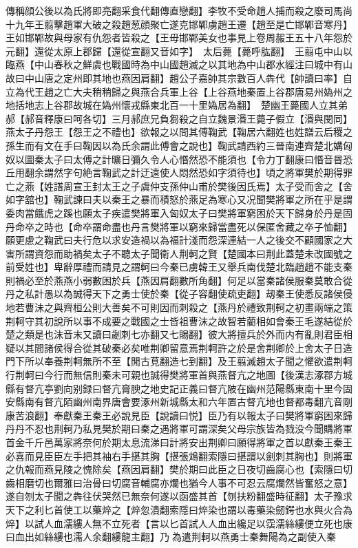 傳稱顔公後以為氏將即亮翻采食代翻傳直戀翻】李牧不受命趙人捕而殺之廢司馬尚十九年王翦擊趙軍大破之殺趙葱顔聚亡遂克邯鄲虜趙王遷【趙至是亡邯鄲音寒丹】王如邯鄲故與母家有仇怨者皆殺之【王毋邯鄲美女也事見上卷周赧王五十八年怨於元翻】還從太原上郡歸【還從宣翻又音如字】　太后薨【薨呼肱翻】　王翦屯中山以臨燕【中山春秋之鮮虞也戰國時為中山國趙滅之以其地為中山郡水經注曰城中有山故曰中山唐之定州即其地也燕因肩翻】趙公子嘉帥其宗數百人犇代【帥讀曰率】自立為代王趙之亡大夫稍稍歸之與燕合兵軍上谷【上谷燕地秦置上谷郡唐易州媯州之地括地志上谷郡故城在媯州懷戎縣東北百一十里媯居為翻】　楚幽王薨國人立其弟郝【郝音釋康曰呵各切】三月郝庶兄負芻殺之自立魏景湣王薨子假立【湣與閔同】　燕太子丹怨王【怨王之不禮也】欲報之以問其傅鞠武【鞠居六翻姓也姓譜云后稷之孫生而有文在手曰鞠因以為氏余謂此傅會之說也】鞠武請西約三晉南連齊楚北媾匈奴以圖秦太子曰太傅之計曠日彌久令人心惽然恐不能須也【令力丁翻康曰惽音昬恐丘用翻余謂然字句絶言鞠武之計迂遠使人悶然恐如字須待也】頃之將軍樊於期得罪亡之燕【姓譜周宣王封太王之子虞仲支孫仲山甫於樊後因氏焉】太子受而舍之【舍如字舘也】鞠武諫曰夫以秦王之暴而積怒於燕足為寒心又况聞樊將軍之所在乎是謂委肉當餓虎之蹊也願太子疾遣樊將軍入匈奴太子曰樊將軍窮困於天下歸身於丹是固丹命卒之時也【命卒謂命盡也丹言樊將軍以窮來歸當盡死以保匿舍藏之卒子恤翻】願更慮之鞠武曰夫行危以求安造禍以為福計淺而怨深連結一人之後交不顧國家之大害所謂資怨而助禍矣太子不聽太子聞衛人荆軻之賢【楚國本曰荆此蓋楚未改國號之前受姓也】卑辭厚禮而請見之謂軻曰今秦已虜韓王又舉兵南伐楚北臨趙趙不能支秦則禍必至於燕燕小弱數困於兵【燕因肩翻數所角翻】何足以當秦諸侯服秦莫敢合從丹之私計愚以為誠得天下之勇士使於秦【從子容翻使疏吏翻】刼秦王使悉反諸侯侵地若曹沬之與齊桓公則大善矣不可則因而刺殺之【燕丹於禮致荆軻之初畫兩端之策荆軻守其初說所以事不成要之戰國之士皆祖曹沫之故智若藺相如會秦王毛遂結從於楚之類是也沫音末又讀曰劌刺七亦翻又七賜翻】彼大將擅兵於外而内有亂則君臣相疑以其間諸侯得合從其破秦必矣唯荆卿留意焉荆軻許之於是舍荆卿於上舍太子日造門下所以奉養荆軻無所不至【閒古莧翻造七到翻】及王翦滅趙太子聞之懼欲遣荆軻行荆軻曰今行而無信則秦未可親也誠得樊將軍首與燕督亢之地圖【後漢志涿郡方城縣有督亢亭劉向别録曰督亢膏腴之地史記正義曰督亢陂在幽州范陽縣東南十里今固安縣南有督亢陌幽州南界唐會要涿州新城縣太和六年置古督亢地也督都毒翻亢音剛康苦浪翻】奉獻秦王秦王必說見臣【說讀曰悦】臣乃有以報太子曰樊將軍窮困來歸丹丹不忍也荆軻乃私見樊於期曰秦之遇將軍可謂深矣父母宗族皆為戮没今聞購將軍首金千斤邑萬家將奈何於期太息流涕曰計將安出荆卿曰願得將軍之首以獻秦王秦王必喜而見臣臣左手把其袖右手揕其胸【揕張鴆翻索隱曰揕謂以劍刺其胸也】則將軍之仇報而燕見陵之愧除矣【燕因肩翻】樊於期曰此臣之日夜切齒腐心也【索隱曰切齒相磨切也爾雅曰治骨曰切腐音輔腐亦爛也猶今人事不可忍云腐爛然皆奮怒之意】遂自刎太子聞之犇往伏哭然已無奈何遂以函盛其首【刎扶粉翻盛時征翻】太子豫求天下之利匕首使工以藥焠之【焠忽潰翻索隱曰焠染也謂以毒藥染劒鍔也水與火合為焠】以試人血濡縷人無不立死者【言以匕首試人人血出纔足以霑濡絲縷便立死也康曰血出如絲縷也濡人余翻縷龍主翻】乃為遣荆軻以燕勇士秦舞陽為之副使入秦

